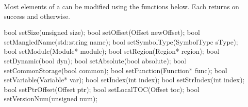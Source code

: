 Most elements of a  can be modified using the functions below. Each returns  on success and  otherwise.

\begin{apient}
bool setSize(unsigned size);
bool setOffset(Offset newOffset);
bool setMangledName(std::string name);
bool setSymbolType(SymbolType sType);
bool setModule(Module* module);
bool setRegion(Region* region);
bool setDynamic(bool dyn);
bool setAbsolute(bool absolute);
bool setCommonStorage(bool common);
bool setFunction(Function* func);
bool setVariable(Variable* var);
bool setIndex(int index);
bool setStrIndex(int index);
bool setPtrOffset(Offset ptr);
bool setLocalTOC(Offset toc);
bool setVersionNum(unsigned num);
\end{apient}
